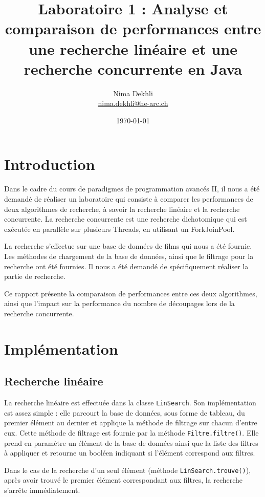 \documentclass[
  french,
  a4paper,
]{scrartcl}
\title{Laboratoire 1 : Analyse et comparaison de performances 
entre une recherche linéaire et une recherche concurrente en Java}
\author{Nima Dekhli\\
    \small \href{mailto:nima.dekhli@he-arc.ch}{nima.dekhli@he-arc.ch}}
\date{\today}
\begin{document}
\maketitle
\tableofcontents

\section{Introduction}

Dans le cadre du cours de paradigmes de programmation avancés II, il nous 
a été demandé de réaliser un laboratoire qui consiste à comparer les performances
de deux algorithmes de recherche, à savoir la recherche linéaire et la recherche
concurrente. La recherche concurrente est une recherche dichotomique qui est
exécutée en parallèle sur plusieurs Threads, en utilisant un ForkJoinPool.

La recherche s'effectue sur une base de données de films qui nous a été fournie. 
Les méthodes de chargement de la base de données, ainsi que le filtrage 
pour la recherche ont été fournies. Il nous a été demandé de spécifiquement réaliser
la partie de recherche. 

Ce rapport présente la comparaison de performances entre ces deux algorithmes, 
ainsi que l'impact sur la performance du nombre de découpages 
lors de la recherche concurrente.

\section{Implémentation}

\subsection{Recherche linéaire}

La recherche linéaire est effectuée dans la classe 
\lstinline|LinSearch|. Son implémentation est assez simple : 
elle parcourt la base de données, sous forme de tableau, du premier élément 
au dernier et applique la méthode de filtrage sur chacun d'entre eux. 
Cette méthode de filtrage est fournie par la méthode \lstinline|Filtre.filtre()|.
Elle prend en paramètre un élément de la base de données ainsi que la liste des filtres
à appliquer et retourne un booléen indiquant si l'élément correspond aux filtres. 

Dans le cas de la recherche d'un seul élément (méthode \lstinline|LinSearch.trouve()|), après 
avoir trouvé le premier élément correspondant aux filtres, la recherche s'arrête 
immédiatement. 
\end{document}
